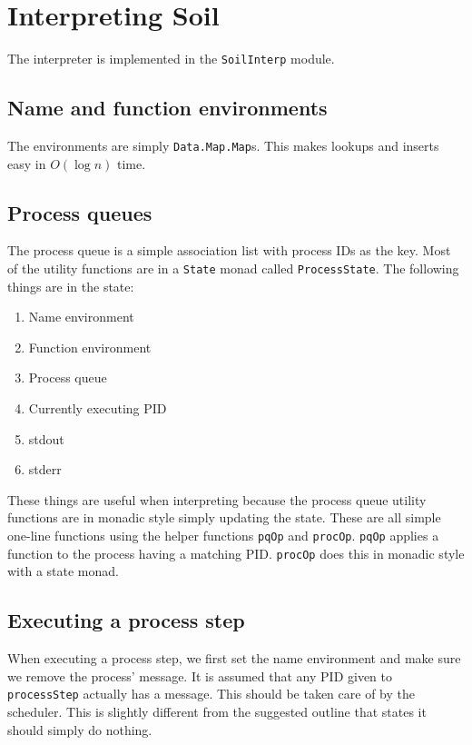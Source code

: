 
\section{Interpreting Soil}

The interpreter is implemented in the \verb|SoilInterp| module.

\subsection{Name and function environments}

The environments are simply \verb|Data.Map.Map|s. This makes lookups and
inserts easy in $O(\log n)$ time.

\subsection{Process queues}

The process queue is a simple association list with process IDs as the key.
Most of the utility functions are in a \verb|State| monad called
\verb|ProcessState|. The following things are in the state:

\begin{enumerate}
    \item Name environment
    \item Function environment
    \item Process queue
    \item Currently executing PID
    \item stdout
    \item stderr
\end{enumerate}

These things are useful when interpreting because the process queue utility
functions are in monadic style simply updating the state. These are all simple
one-line functions using the helper functions \verb|pqOp| and \verb|procOp|.
\verb|pqOp| applies a function to the process having a matching PID.
\verb|procOp| does this in monadic style with a state monad.

\subsection{Executing a process step}

When executing a process step, we first set the name environment and make sure
we remove the process' message. It is assumed that any PID given to
\verb|processStep| actually has a message. This should be taken care of by the
scheduler. This is slightly different from the suggested outline that states it
should simply do nothing.

